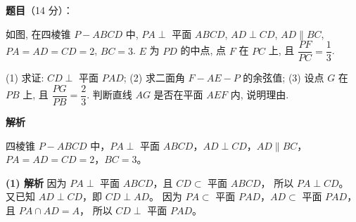 \begin{answer}

\textbf{题目}（14 分）：

如图, 在四棱锥 $P - ABCD$ 中, $PA \perp$ 平面 $ABCD$, $AD \perp CD$, $AD \parallel BC$, $PA = AD = CD = 2$, $BC = 3$. $E$ 为 $PD$ 的中点, 点 $F$ 在 $PC$ 上, 且 $\dfrac{PF}{PC} = \dfrac{1}{3}$.
\nopagebreak[4]
\begin{center}\end{center}
\nopagebreak[4]
(1) 求证: $CD \perp$ 平面 $PAD$;  
(2) 求二面角 $F - AE - P$ 的余弦值;  
(3) 设点 $G$ 在 $PB$ 上, 且 $\dfrac{PG}{PB} = \dfrac{2}{3}$. 判断直线 $AG$ 是否在平面 $AEF$ 内, 说明理由.

\textbf{解析}

四棱锥 $P - ABCD$ 中，$PA \perp$ 平面 $ABCD$，$AD \perp CD$，$AD \parallel BC$，$PA = AD = CD = 2$，$BC = 3$。

\textbf{(1) 解析}
因为 $PA \perp$ 平面 $ABCD$，且 $CD \subset$ 平面 $ABCD$，
所以 $PA \perp CD$。
又已知 $AD \perp CD$，即 $CD \perp AD$。
因为 $PA \subset$ 平面 $PAD$，$AD \subset$ 平面 $PAD$，且 $PA \cap AD = A$，
所以 $CD \perp$ 平面 $PAD$。


\end{answer}

